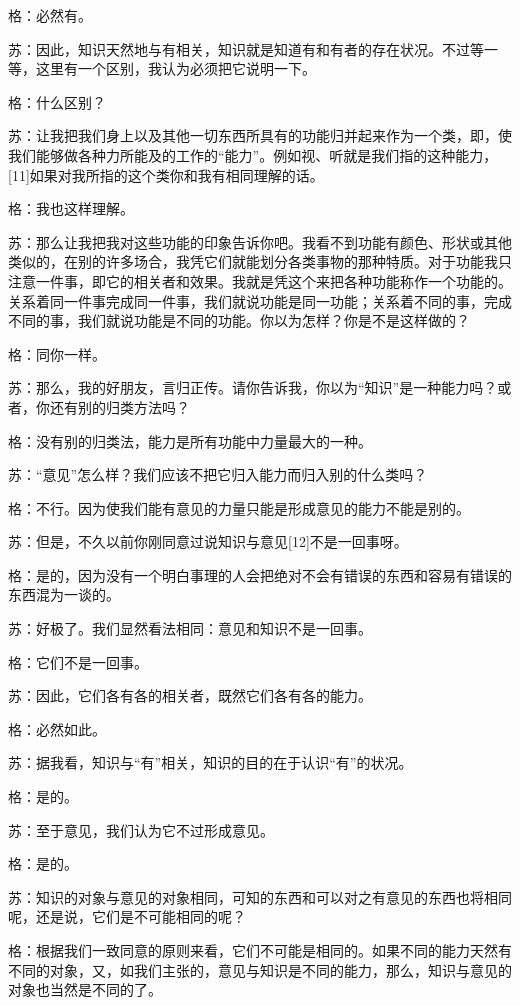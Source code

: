 \documentclass[12pt,oneside]{book}
\begin{document}
格：必然有。

苏：因此，知识天然地与有相关，知识就是知道有和有者的存在状况。不过等一等，这里有一个区别，我认为必须把它说明一下。

格：什么区别？

苏：让我把我们身上以及其他一切东西所具有的功能归并起来作为一个类，即，使我们能够做各种力所能及的工作的“能力”。例如视、听就是我们指的这种能力，[11]如果对我所指的这个类你和我有相同理解的话。

格：我也这样理解。

苏：那么让我把我对这些功能的印象告诉你吧。我看不到功能有颜色、形状或其他类似的，在别的许多场合，我凭它们就能划分各类事物的那种特质。对于功能我只注意一件事，即它的相关者和效果。我就是凭这个来把各种功能称作一个功能的。关系着同一件事完成同一件事，我们就说功能是同一功能；关系着不同的事，完成不同的事，我们就说功能是不同的功能。你以为怎样？你是不是这样做的？

格：同你一样。

苏：那么，我的好朋友，言归正传。请你告诉我，你以为“知识”是一种能力吗？或者，你还有别的归类方法吗？

格：没有别的归类法，能力是所有功能中力量最大的一种。

苏：“意见”怎么样？我们应该不把它归入能力而归入别的什么类吗？

格：不行。因为使我们能有意见的力量只能是形成意见的能力不能是别的。

苏：但是，不久以前你刚同意过说知识与意见[12]不是一回事呀。

格：是的，因为没有一个明白事理的人会把绝对不会有错误的东西和容易有错误的东西混为一谈的。

苏：好极了。我们显然看法相同：意见和知识不是一回事。

格：它们不是一回事。

苏：因此，它们各有各的相关者，既然它们各有各的能力。

格：必然如此。

苏：据我看，知识与“有”相关，知识的目的在于认识“有”的状况。

格：是的。

苏：至于意见，我们认为它不过形成意见。

格：是的。

苏：知识的对象与意见的对象相同，可知的东西和可以对之有意见的东西也将相同呢，还是说，它们是不可能相同的呢？

格：根据我们一致同意的原则来看，它们不可能是相同的。如果不同的能力天然有不同的对象，又，如我们主张的，意见与知识是不同的能力，那么，知识与意见的对象也当然是不同的了。
\end{document}
